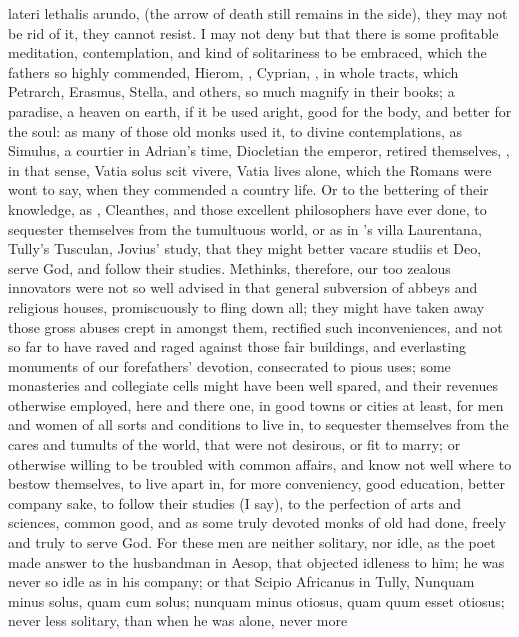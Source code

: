 {{lateri lethalis arundo, (the arrow of death still remains in the side),
they may not be rid of it, they cannot resist. I may not deny but
that there is some profitable meditation, contemplation, and kind of
solitariness to be embraced, which the fathers so highly commended,
 Hierom, \Chrysostom{}, Cyprian, \Austin{}, in whole tracts, which
Petrarch, Erasmus, Stella, and others, so much magnify in their books;
a paradise, a heaven on earth, if it be used aright, good for the body,
and better for the soul: as many of those old monks used it, to divine
contemplations, as Simulus, a courtier in Adrian's time, Diocletian the
emperor, retired themselves, \etc{}, in that sense, Vatia solus scit
vivere, Vatia lives alone, which the Romans were wont to say, when they
commended a country life. Or to the bettering of their knowledge, as
\Democritus{}, Cleanthes, and those excellent philosophers have ever done,
to sequester themselves from the tumultuous world, or as in \Pliny{}'s
villa Laurentana, Tully's Tusculan, Jovius' study, that they might
better vacare studiis et Deo, serve God, and follow their studies.
Methinks, therefore, our too zealous innovators were not so well
advised in that general subversion of abbeys and religious houses,
promiscuously to fling down all; they might have taken away those gross
abuses crept in amongst them, rectified such inconveniences, and not so
far to have raved and raged against those fair buildings, and
everlasting monuments of our forefathers' devotion, consecrated to
pious uses; some monasteries and collegiate cells might have been well
spared, and their revenues otherwise employed, here and there one, in
good towns or cities at least, for men and women of all sorts and
conditions to live in, to sequester themselves from the cares and
tumults of the world, that were not desirous, or fit to marry; or
otherwise willing to be troubled with common affairs, and know not well
where to bestow themselves, to live apart in, for more conveniency,
good education, better company sake, to follow their studies (I say),
to the perfection of arts and sciences, common good, and as some truly
devoted monks of old had done, freely and truly to serve God. For these
men are neither solitary, nor idle, as the poet made answer to the
husbandman in Aesop, that objected idleness to him; he was never so
idle as in his company; or that Scipio Africanus in Tully,
Nunquam minus solus, quam cum solus; nunquam minus otiosus, quam quum
esset otiosus; never less solitary, than when he was alone, never more
}}
